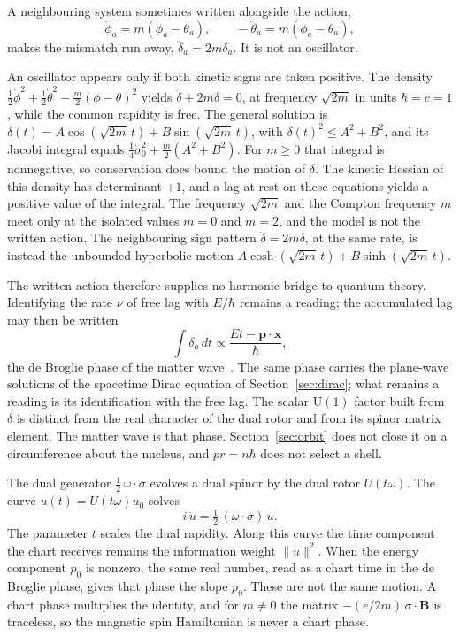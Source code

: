 \documentclass[a4paper]{article}
\begin{document}
A neighbouring system sometimes written alongside the action,
\[
\ddot{\phi}_a = m (\phi_a - \theta_a), \qquad -\ddot{\theta}_a = m (\phi_a - \theta_a),
\]
makes the mismatch run away, $\ddot\delta_a=2m\delta_a$. It is not an oscillator.

An oscillator appears only if both kinetic signs are taken positive. The density $\tfrac12\dot\phi^2+\tfrac12\dot\theta^2-\tfrac m2(\phi-\theta)^2$ yields $\ddot\delta+2m\delta=0$, at frequency $\sqrt{2m}$ in units $\hbar=c=1$, while the common rapidity is free. The general solution is $\delta(t)=A\cos(\sqrt{2m}\,t)+B\sin(\sqrt{2m}\,t)$, with $\delta(t)^2\le A^2+B^2$, and its Jacobi integral equals $\tfrac14\dot\sigma_0^2+\tfrac m2(A^2+B^2)$. For $m\ge 0$ that integral is nonnegative, so conservation does bound the motion of $\delta$. The kinetic Hessian of this density has determinant $+1$, and a lag at rest on these equations yields a positive value of the integral. The frequency $\sqrt{2m}$ and the Compton frequency $m$ meet only at the isolated values $m=0$ and $m=2$, and the model is not the written action. The neighbouring sign pattern $\ddot\delta=2m\delta$, at the same rate, is instead the unbounded hyperbolic motion $A\cosh(\sqrt{2m}\,t)+B\sinh(\sqrt{2m}\,t)$.

The written action therefore supplies no harmonic bridge to quantum theory. Identifying the rate $\nu$ of free lag with $E/\hbar$ remains a reading; the accumulated lag may then be written
\[
\int \delta_a \, dt \propto \frac{E t - \mathbf{p} \cdot \mathbf{x}}{\hbar},
\]
the de Broglie phase of the matter wave~\cite{dst-debroglie}. The same phase carries the plane-wave solutions of the spacetime Dirac equation of Section~\ref{sec:dirac}; what remains a reading is its identification with the free lag. The scalar $\mathrm{U}(1)$ factor built from $\delta$ is distinct from the real character of the dual rotor and from its spinor matrix element. The matter wave is that phase. Section~\ref{sec:orbit} does not close it on a circumference about the nucleus, and $pr=n\hbar$ does not select a shell.

The dual generator $\tfrac12\,\omega\cdot\sigma$ evolves a dual spinor by the dual rotor $U(t\omega)$. The curve $u(t)=U(t\omega)u_0$ solves
\[
i\,\dot u=\tfrac12\,(\omega\cdot\sigma)\,u.
\]
The parameter $t$ scales the dual rapidity. Along this curve the time component the chart receives remains the information weight $\lVert u\rVert^2$. When the energy component $p_0$ is nonzero, the same real number, read as a chart time in the de Broglie phase, gives that phase the slope $p_0$. These are not the same motion. A chart phase multiplies the identity, and for $m\neq 0$ the matrix $-(e/2m)\,\sigma\cdot\mathbf B$ is traceless, so the magnetic spin Hamiltonian is never a chart phase.
\end{document}
